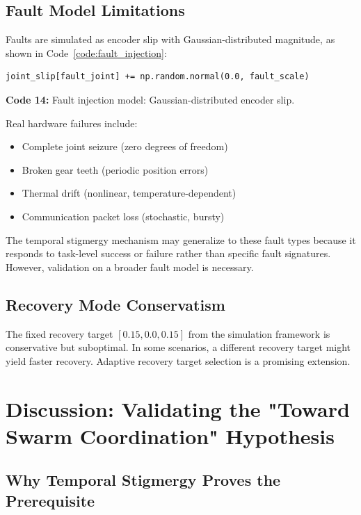 \documentclass[12pt,a4paper,oneside]{report}
\begin{document}
\subsection{Fault Model Limitations}
\label{subsec:fault_model_limitations}

Faults are simulated as encoder slip with Gaussian-distributed magnitude, as shown in Code~\ref{code:fault_injection}:

\begin{verbatim}
joint_slip[fault_joint] += np.random.normal(0.0, fault_scale)
\end{verbatim}
\vspace{0.2cm}
{\small \textbf{Code 14:} Fault injection model: Gaussian-distributed encoder slip.\label{code:fault_injection}}
\vspace{0.3cm}

Real hardware failures include:
\begin{itemize}
    \item Complete joint seizure (zero degrees of freedom)
    \item Broken gear teeth (periodic position errors)
    \item Thermal drift (nonlinear, temperature-dependent)
    \item Communication packet loss (stochastic, bursty)
\end{itemize}

The temporal stigmergy mechanism may generalize to these fault types because it responds to task-level success or failure rather than specific fault signatures. However, validation on a broader fault model is necessary.

\subsection{Recovery Mode Conservatism}
\label{subsec:recovery_mode_conservatism}

The fixed recovery target $[0.15, 0.0, 0.15]$ from the simulation framework is conservative but suboptimal. In some scenarios, a different recovery target might yield faster recovery. Adaptive recovery target selection is a promising extension.

\section{Discussion: Validating the "Toward Swarm Coordination" Hypothesis}

\subsection{Why Temporal Stigmergy Proves the Prerequisite}
\label{subsec:why_temporal_stigmergy_proves_the_prerequisite}
\end{document}
